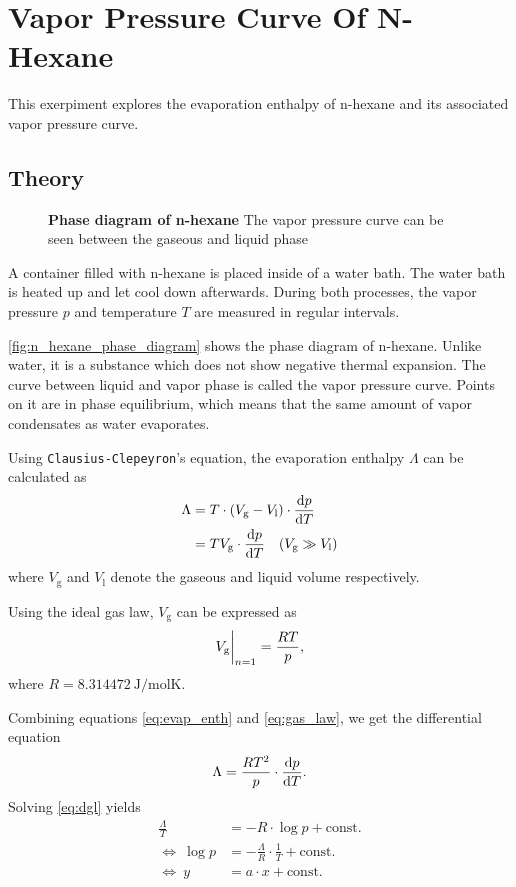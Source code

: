 \chapter{Vapor Pressure Curve Of N-Hexane}
This exerpiment explores the evaporation enthalpy of n-hexane and its associated vapor pressure curve.

\section{Theory}
\begin{figure}[tbp]
	\centering
	\caption{\textbf{Phase diagram of n-hexane} The vapor pressure curve can be seen between the gaseous and liquid phase}
	\label{fig:n_hexane_phase_diagram}
\end{figure}

A container filled with n-hexane is placed inside of a water bath.
The water bath is heated up and let cool down afterwards.
During both processes, the vapor pressure $p$ and temperature $T$ are measured in regular intervals.

\autoref{fig:n_hexane_phase_diagram} shows the phase diagram of n-hexane.
Unlike water, it is a substance which does not show negative thermal expansion.
The curve between liquid and vapor phase is called the vapor pressure curve.
Points on it are in phase equilibrium, which means that the same amount of vapor condensates as water evaporates.

Using \texttt{Clausius-Clepeyron}'s equation, the evaporation enthalpy $\Lambda$ can be calculated as
\begin{align}\label{eq:evap_enth}
	\Lambda&=T\cdot\left(V_\text{g}-V_\text{l}\right)\cdot\frac{\d p}{\d T} \nonumber \\
	&=TV_\text{g}\cdot\frac{\d p}{\d T}\quad(V_\text{g}\gg V_\text{l})
\end{align}
where $V_\text{g}$ and $V_\text{l}$ denote the gaseous and liquid volume respectively.

Using the ideal gas law, $V_\text{g}$ can be expressed as
\begin{equation}\label{eq:gas_law}
	V_\text{g}\at[\bigg]{n=1}=\frac{RT}{p},
\end{equation}
where $R=\SI{8.314472}{\joule\per\mole\kelvin}$.

Combining equations \ref{eq:evap_enth} and \ref{eq:gas_law}, we get the differential equation
\begin{equation}\label{eq:dgl}
	\Lambda=\frac{RT^2}{p}\cdot\frac{\d p}{\d T}.
\end{equation}
Solving \autoref{eq:dgl} yields
\begin{align}
	\frac{\Lambda}{T}&=-R\cdot\log{p}+\text{const.} \nonumber \\
	\Leftrightarrow\ \log{p}&=-\frac{\Lambda}{R}\cdot \frac{1}{T} + \text{const.}	\label{eq:fit_eq} \\
	\Leftrightarrow\ y&=a\cdot x + \text{const.} \nonumber
\end{align}

